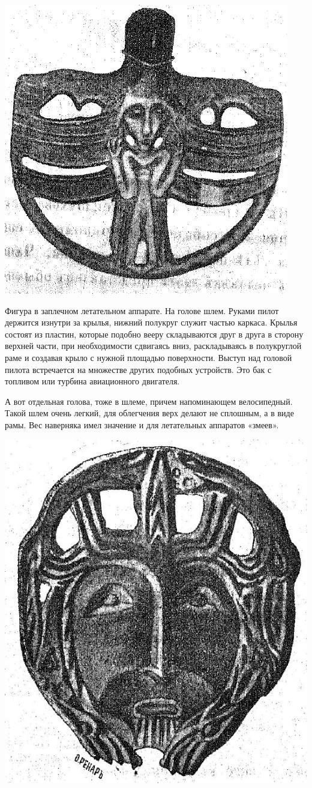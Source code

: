 \begin{center}
\includegraphics[width=0.60\linewidth]{chast-zmiy/ktotakiezmei/ural-bogi-10.jpg}
\end{center}

Фигура в заплечном летательном аппарате. На голове шлем. Руками пилот держится изнутри за крылья, нижний полукруг служит частью каркаса. Крылья состоят из пластин, которые подобно вееру складываются друг в друга в сторону верхней части, при необходимости сдвигаясь вниз, раскладываясь в полукруглой раме и создавая крыло с нужной площадью поверхности. Выступ над головой пилота встречается на множестве других подобных устройств. Это бак с топливом или турбина авиационного двигателя. 

А вот отдельная голова, тоже в шлеме, причем напоминающем велосипедный. Такой шлем очень легкий, для облегчения верх делают не сплошным, а в виде рамы. Вес наверняка имел значение и для летательных аппаратов «змеев». 

\begin{center}
\includegraphics[width=0.80\linewidth]{chast-zmiy/ktotakiezmei/ural-bogi-18.jpg}
\end{center}

